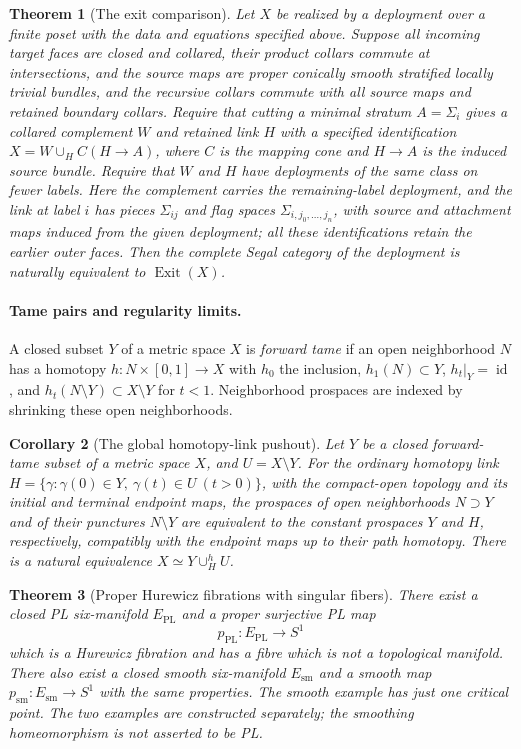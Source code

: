 \documentclass[11pt,a4paper]{article}
\newtheorem{theorem}{Theorem}[section]
\newtheorem{corollary}[theorem]{Corollary}
\theoremstyle{definition}
\newcommand{\id}{\operatorname{id}}
\begin{document}
\begin{theorem}[The exit comparison]\label{thm:exit-deployment}
Let $X$ be realized by a deployment over a finite poset with the data and equations specified above. Suppose all incoming target faces are closed and collared, their product collars commute at intersections, and the source maps are proper conically smooth stratified locally
trivial bundles, and the recursive collars commute with all source
maps and retained boundary collars. Require that cutting a minimal
stratum $A=\Sigma_i$ gives a collared complement $W$ and retained link $H$ with a specified identification $X=W\cup_H C(H\to A)$, where $C$ is the mapping cone and $H\to A$ is the induced source bundle. Require that $W$ and $H$ have deployments of the
same class on fewer labels. Here the complement carries the remaining-label
deployment, and the link at label $i$ has pieces $\Sigma_{ij}$ and flag
spaces $\Sigma_{i,j_0,\ldots,j_n}$, with source and attachment maps induced
from the given deployment; all these identifications retain the earlier
outer faces. Then the complete Segal category of the
deployment is naturally equivalent to $\operatorname{Exit}(X)$.
\end{theorem}

\paragraph{Tame pairs and regularity limits.}
A closed subset $Y$ of a metric space $X$ is \emph{forward tame}
if an open neighborhood $N$ has a homotopy $h:N\times[0,1]\to X$
with $h_0$ the inclusion, $h_1(N)\subset Y$, $h_t|_Y=\id$, and
$h_t(N\setminus Y)\subset X\setminus Y$ for $t<1$.
Neighborhood prospaces are indexed by shrinking these open neighborhoods.
\begin{corollary}[The global homotopy-link pushout]\label{cor:holink-pushout}
Let $Y$ be a closed forward-tame subset of a metric space $X$, and
$U=X\setminus Y$. For the ordinary homotopy link
$H=\{\gamma:\gamma(0)\in Y,\ \gamma(t)\in U\ (t>0)\}$,
with the compact-open topology and its initial and terminal endpoint maps, the prospaces of open neighborhoods $N\supset Y$ and of their punctures $N\setminus Y$ are equivalent to the constant prospaces $Y$ and $H$, respectively, compatibly with the endpoint maps up to their path homotopy. There is a natural equivalence
$X\simeq Y\cup^h_H U$.
\end{corollary}

\begin{theorem}[Proper Hurewicz fibrations with singular fibers]\label{thm:singular-fibers}
There exist a closed PL six-manifold $E_{\mathrm{PL}}$ and a proper
surjective PL map
\[
 p_{\mathrm{PL}}:E_{\mathrm{PL}}\longrightarrow S^1
\]
which is a Hurewicz fibration and has a fibre which is not a topological
manifold.  There also exist a closed smooth six-manifold $E_{\mathrm{sm}}$
and a smooth map $p_{\mathrm{sm}}:E_{\mathrm{sm}}\to S^1$ with the same
properties.  The smooth example has just one critical point.  The two
examples are constructed separately; the smoothing homeomorphism is not
asserted to be PL.
\end{theorem}
\end{document}
